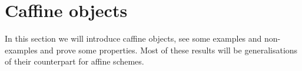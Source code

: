 \section{Caffine objects}
In this section we will introduce caffine objects, see some examples and non-examples
and prove some properties. 
Most of these results will be generalisations of their counterpart for affine schemes.









